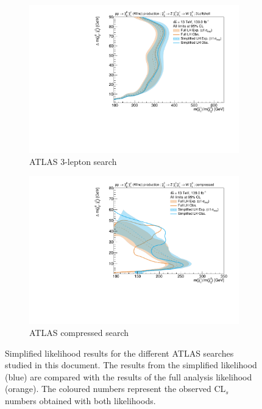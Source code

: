 \begin{figure}
\begin{subfigure}[b]{0.5\textwidth}
		\centering\includegraphics[width=\textwidth]{exclusion_3Loffshell_noLabel}
		\caption{ATLAS 3-lepton search\label{fig:results_3Loffshell}}
	\end{subfigure}\hfill
	\begin{subfigure}[b]{0.5\textwidth}
		\centering\includegraphics[width=\textwidth]{exclusion_compressed_noLabel}
		\caption{ATLAS compressed search~\cite{SUSY-2018-16}\label{fig:results_compressed}}
	\end{subfigure}\hfill
	\caption{Simplified likelihood results for the different ATLAS searches studied in this document. The results from the simplified likelihood (blue) are compared with the results of the full analysis likelihood (orange). The coloured numbers represent the observed CL$_s$ numbers obtained with both likelihoods.}\label{fig:results_analyses}
\end{figure}


